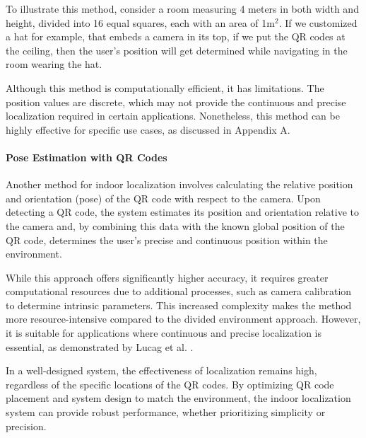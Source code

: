 To illustrate this method, consider a room measuring 4 meters in both width and height, divided into 16 equal squares, each with an area of 1m$^2$. If we customized a hat for example, that embeds a camera in its top, if we put the QR codes at the ceiling, then the user’s position will get determined while navigating in the room wearing the hat.

Although this method is computationally efficient, it has limitations. The position values are discrete, which may not provide the continuous and precise localization required in certain applications. Nonetheless, this method can be highly effective for specific use cases, as discussed in Appendix A.


\paragraph{Pose Estimation with QR Codes}

Another method for indoor localization involves calculating the relative position and orientation (pose) of the QR code with respect to the camera. Upon detecting a QR code, the system estimates its position and orientation relative to the camera and, by combining this data with the known global position of the QR code, determines the user’s precise and continuous position within the environment.

While this approach offers significantly higher accuracy, it requires greater computational resources due to additional processes, such as camera calibration to determine intrinsic parameters. This increased complexity makes the method more resource-intensive compared to the divided environment approach. However, it is suitable for applications where continuous and precise localization is essential, as demonstrated by Lucag et al. \cite{Lucag2017}.



In a well-designed system, the effectiveness of localization remains high, regardless of the specific locations of the QR codes. By optimizing QR code placement and system design to match the environment, the indoor localization system can provide robust performance, whether prioritizing simplicity or precision.